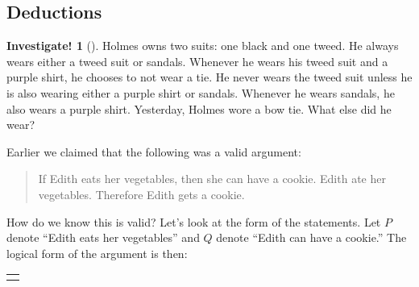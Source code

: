 \documentclass[10pt,]{book}
\theoremstyle{plain}
\theoremstyle{definition}
\theoremstyle{definition}
\theoremstyle{definition}
\newtheorem{investigation}[project]{Investigate!}
\theoremstyle{definition}
\numberwithin{equation}{chapter}
\newcommand{\hrulethin}  {\noalign{\hrule height 0.04em}}
\newlength{\panelmax}
\newcommand{\imp}{\rightarrow}
\begin{document}
\subsection[{Deductions}]{Deductions}\label{subsection-21}
\begin{investigation}[]\label{investigation-16}
\hypertarget{p-1210}{}%
Holmes owns two suits: one black and one tweed. He always wears either a tweed suit or sandals. Whenever he wears his tweed suit and a purple shirt, he chooses to not wear a tie. He never wears the tweed suit unless he is also wearing either a purple shirt or sandals. Whenever he wears sandals, he also wears a purple shirt. Yesterday, Holmes wore a bow tie. What else did he wear?%
\end{investigation}
\hypertarget{p-1211}{}%
Earlier we claimed that the following was a valid argument:%
\begin{quote}\hypertarget{blockquote-8}{}
\hypertarget{p-1212}{}%
If Edith eats her vegetables, then she can have a cookie. Edith ate her vegetables. Therefore Edith gets a cookie.%
\end{quote}
\hypertarget{p-1213}{}%
How do we know this is valid? Let's look at the form of the statements. Let \(P\) denote ``Edith eats her vegetables'' and \(Q\) denote ``Edith can have a cookie.'' The logical form of the argument is then:%
{%
\setlength{\panelmax}{0pt}
\ifdefined\panelboxAtabular\else\newsavebox{\panelboxAtabular}\fi%
\savebox{\panelboxAtabular}{%
\raisebox{\depth}{\parbox{1\linewidth}{\centering\begin{tabular}{cc}
&\(P \imp Q\)\tabularnewline[0pt]
&\(P\)\tabularnewline\hrulethin
\(\therefore\)&\(Q\)
\end{tabular}
}}}
\ifdefined\phAtabular\else\newlength{\phAtabular}\fi%
\setlength{\phAtabular}{\ht\panelboxAtabular+\dp\panelboxAtabular}
\settototalheight{\phAtabular}{\usebox{\panelboxAtabular}}
\setlength{\panelmax}{\maxof{\panelmax}{\phAtabular}}
\leavevmode%
\setlength{\tabcolsep}{0\linewidth}
\par\medskip\noindent
\begin{tabular}{@{}*{1}{c}@{}}
\begin{minipage}[c][\panelmax][t]{1\linewidth}\usebox{\panelboxAtabular}\end{minipage}\end{tabular}\\
}%
\end{document}
